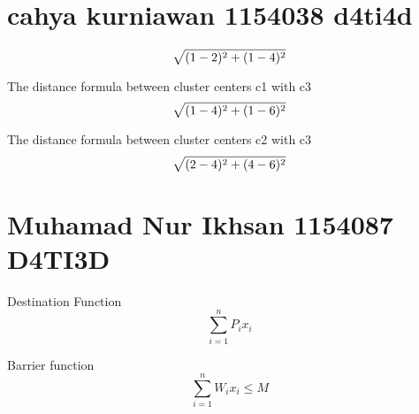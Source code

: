 \section{cahya kurniawan 1154038 d4ti4d}
\par
\begin{equation}
\label{eq:1}
\sqrt{(1-2)\sp{2} + (1-4)\sp{2}}
    \end{equation}
\par
The distance formula between cluster centers c1 with c3
\begin{equation}
\label{eq:2}
\sqrt{(1-4)\sp{2} + (1-6)\sp{2}}
    \end{equation}
\par
The distance formula between cluster centers c2 with c3
\begin{equation}
\label{eq:3}
\sqrt{(2-4)\sp{2} + (4-6)\sp{2}}
    \end{equation}


\section{Muhamad Nur Ikhsan 1154087 D4TI3D}
\par Destination Function
\begin{equation}
  \sum \limits_{i=1}^{n} {P_i} {x_i}
  \label{eq:4}
\end{equation}

\par Barrier function
\begin{equation}
  \sum \limits_{i=1}^{n} {W_i} {x_i} \leq M
  \label{eq:5}
\end{equation}
